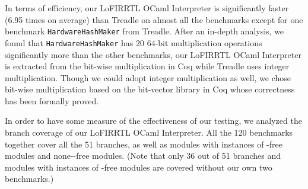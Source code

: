 In terms of efficiency, our LoFIRRTL OCaml Interpreter is significantly faster (6.95 times on average) than Treadle on almost all the benchmarks
except for one benchmark \texttt{HardwareHashMaker} from Treadle.
After an in-depth analysis, we found that \texttt{HardwareHashMaker} has 20 64-bit multiplication operations significantly more than the other benchmarks,
our LoFIRRTL OCaml Interpreter is extracted from the bit-wise multiplication in Coq while Treadle uses integer multiplication.
Though we could adopt integer multiplication as well,
we chose bit-wise multiplication based on the bit-vector library in Coq whose correctness has been formally proved.
%
%


In order to have some measure of the effectiveness of our testing, we analyzed the branch coverage of our LoFIRRTL OCaml Interpreter.
All the 120 benchmarks together cover all the 51 branches, as well as modules with instances of -free modules
and none--free modules. (Note that only 36 out of 51 branches and modules with instances of -free modules are covered without our own two benchmarks.)


